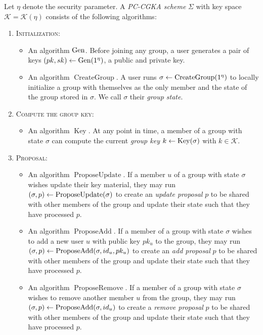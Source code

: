 \begin{definition}[PC-CGKA]
	Let $\eta$ denote the security parameter.
	A \emph{PC-CGKA scheme} $\Sigma$ with key space $\mathcal{K} = \mathcal{K}(\eta)$ consists of the following algorithms:
	\begin{enumerate}[1.]
		\item[] \textsc{Initialization:}
			\begin{itemize}
				\item An algorithm $\mathrm{Gen}$. Before joining any group, a user generates a pair of keys $(pk, sk) \leftarrow \mathrm{Gen}(1^\eta)$, a public and private key.
				\item An algorithm $\operatorname{CreateGroup}$. A user runs $\sigma \leftarrow \operatorname{CreateGroup}(1^\eta)$ to locally initialize a group with themselves as the only member and the state of the group stored in $\sigma$. We call $\sigma$ their \emph{group state}.
			\end{itemize}
		\item[] \textsc{Compute the group key:}
			\begin{itemize}
				\item An algorithm $\operatorname{Key}$. At any point in time, a member of a group with state $\sigma$ can compute the current \emph{group key} $k \leftarrow \operatorname{Key}(\sigma)$ with $k \in \mathcal{K}$.
			\end{itemize}
		\item[] \textsc{Proposal:}
			\begin{itemize}
				\item An algorithm $\operatorname{ProposeUpdate}$. If a member $u$ of a group with state $\sigma$ wishes update their key material, they may run $(\sigma, p) \leftarrow \operatorname{ProposeUpdate}(\sigma)$ to create an \emph{update proposal} $p$ to be shared with other members of the group and update their state such that they have processed $p$.
				\item An algorithm $\operatorname{ProposeAdd}$. If a member of a group with state $\sigma$ wishes to add a new user $u$ with public key $pk_u$ to the group, they may run $(\sigma, p) \leftarrow \operatorname{ProposeAdd}(\sigma, id_u, pk_u)$ to create an \emph{add proposal} $p$ to be shared with other members of the group and update their state such that they have processed $p$.
				\item An algorithm $\operatorname{ProposeRemove}$. If a member of a group with state $\sigma$ wishes to remove another member $u$ from the group, they may run $(\sigma, p) \leftarrow \operatorname{ProposeAdd}(\sigma, id_u)$ to create a \emph{remove proposal} $p$ to be shared with other members of the group and update their state such that they have processed $p$.

\end{itemize}
\end{enumerate}
\end{definition}
